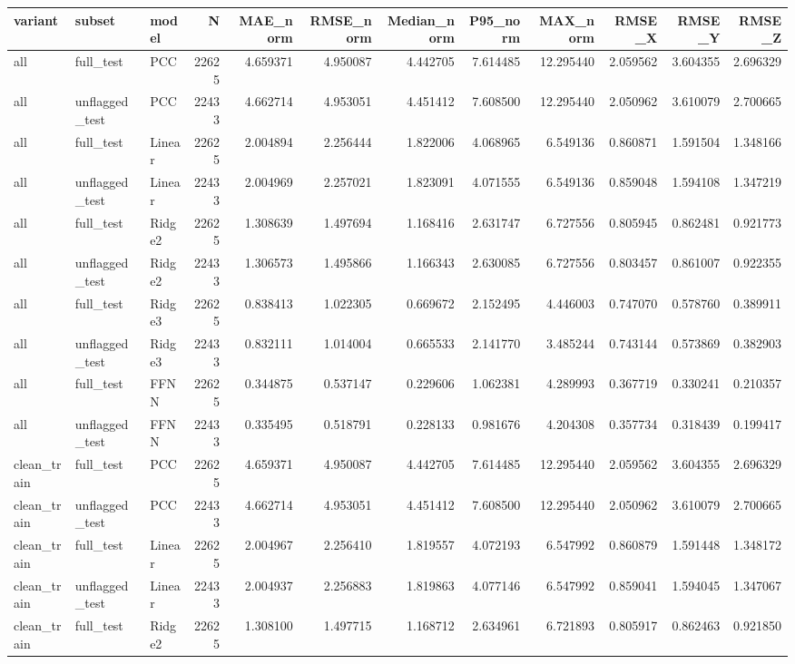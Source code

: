 \begin{tabular}{lllrrrrrrrrr}
\toprule
variant & subset & model & N & MAE_norm & RMSE_norm & Median_norm & P95_norm & MAX_norm & RMSE_X & RMSE_Y & RMSE_Z \\
\midrule
all & full_test & PCC & 22625 & 4.659371 & 4.950087 & 4.442705 & 7.614485 & 12.295440 & 2.059562 & 3.604355 & 2.696329 \\
all & unflagged_test & PCC & 22433 & 4.662714 & 4.953051 & 4.451412 & 7.608500 & 12.295440 & 2.050962 & 3.610079 & 2.700665 \\
all & full_test & Linear & 22625 & 2.004894 & 2.256444 & 1.822006 & 4.068965 & 6.549136 & 0.860871 & 1.591504 & 1.348166 \\
all & unflagged_test & Linear & 22433 & 2.004969 & 2.257021 & 1.823091 & 4.071555 & 6.549136 & 0.859048 & 1.594108 & 1.347219 \\
all & full_test & Ridge2 & 22625 & 1.308639 & 1.497694 & 1.168416 & 2.631747 & 6.727556 & 0.805945 & 0.862481 & 0.921773 \\
all & unflagged_test & Ridge2 & 22433 & 1.306573 & 1.495866 & 1.166343 & 2.630085 & 6.727556 & 0.803457 & 0.861007 & 0.922355 \\
all & full_test & Ridge3 & 22625 & 0.838413 & 1.022305 & 0.669672 & 2.152495 & 4.446003 & 0.747070 & 0.578760 & 0.389911 \\
all & unflagged_test & Ridge3 & 22433 & 0.832111 & 1.014004 & 0.665533 & 2.141770 & 3.485244 & 0.743144 & 0.573869 & 0.382903 \\
all & full_test & FFNN & 22625 & 0.344875 & 0.537147 & 0.229606 & 1.062381 & 4.289993 & 0.367719 & 0.330241 & 0.210357 \\
all & unflagged_test & FFNN & 22433 & 0.335495 & 0.518791 & 0.228133 & 0.981676 & 4.204308 & 0.357734 & 0.318439 & 0.199417 \\
clean_train & full_test & PCC & 22625 & 4.659371 & 4.950087 & 4.442705 & 7.614485 & 12.295440 & 2.059562 & 3.604355 & 2.696329 \\
clean_train & unflagged_test & PCC & 22433 & 4.662714 & 4.953051 & 4.451412 & 7.608500 & 12.295440 & 2.050962 & 3.610079 & 2.700665 \\
clean_train & full_test & Linear & 22625 & 2.004967 & 2.256410 & 1.819557 & 4.072193 & 6.547992 & 0.860879 & 1.591448 & 1.348172 \\
clean_train & unflagged_test & Linear & 22433 & 2.004937 & 2.256883 & 1.819863 & 4.077146 & 6.547992 & 0.859041 & 1.594045 & 1.347067 \\
clean_train & full_test & Ridge2 & 22625 & 1.308100 & 1.497715 & 1.168712 & 2.634961 & 6.721893 & 0.805917 & 0.862463 & 0.921850 \\

\end{tabular}

